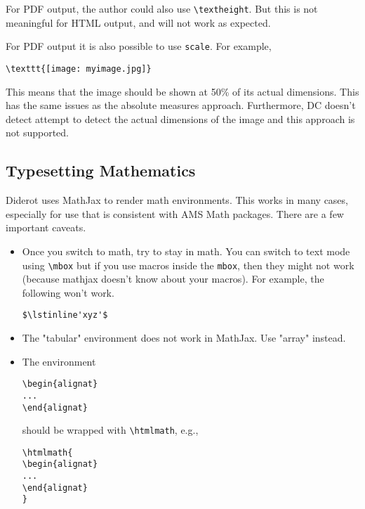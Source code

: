 \begin{note}
For PDF output, the author could also use \lstinline`\textheight`.
%
But this is not meaningful for HTML output, and will not work as expected.
\end{note}

\begin{important}
For PDF output it is also possible to use \lstinline'scale'.  For example,
\begin{lstlisting}
\texttt{[image: myimage.jpg]}
\end{lstlisting}

This means that the image should be shown at 50\% of its actual dimensions.  This has  the same issues as the absolute measures approach. Furthermore, DC doesn't detect attempt to detect the actual dimensions of the image and this approach is not supported.
\end{important}

\subsection{Typesetting Mathematics}

Diderot uses MathJax to render math environments.  This works in many cases, especially for use that is consistent with AMS Math packages.  There are a few important caveats. 
%
\begin{itemize}
\item Once you switch to math, try to stay in math.  You can switch to text mode using \lstinline`\mbox` but if you use macros inside  the \lstinline`mbox`, then they might not work (because mathjax doesn't know about your macros).  For example, the following won't work. 
\begin{lstlisting}
$\lstinline'xyz'$
\end{lstlisting}

\item The "tabular" environment does not work in MathJax.  Use "array" instead.

\item  The environment 
\begin{lstlisting}
\begin{alignat} 
... 
\end{alignat}
\end{lstlisting}
%
should be wrapped with \lstinline`\htmlmath`, e.g.,
%
\begin{lstlisting}
\htmlmath{
\begin{alignat} 
... 
\end{alignat}
}
\end{lstlisting} 
\end{itemize}


